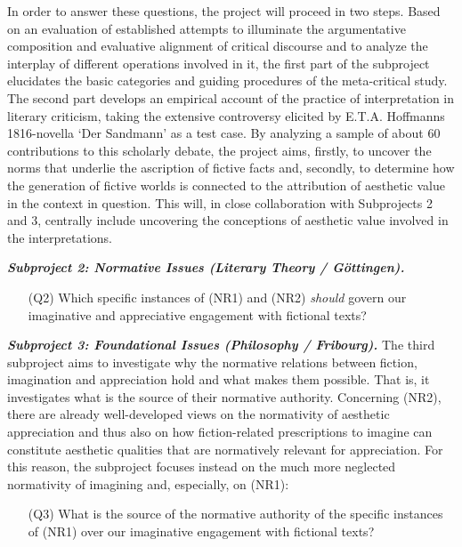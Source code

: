In order to answer these questions, the project will proceed in two steps. Based on an evaluation of established attempts to illuminate the argumentative composition and evaluative alignment of critical discourse and to analyze the interplay of different operations involved in it, the first part of the subproject elucidates the basic categories and guiding procedures of the meta-critical study. The second part develops an empirical account of the practice of interpretation in literary criticism, taking the extensive controversy elicited by E.T.A. Hoffmanns 1816-novella `Der Sandmann' as a test case. By analyzing a sample of about 60 contributions to this scholarly debate, the project aims, firstly, to uncover the norms that underlie the ascription of fictive facts and, secondly, to determine how the generation of fictive worlds is connected to the attribution of aesthetic value in the context in question. This will, in close collaboration with Subprojects 2 and 3, centrally include uncovering the conceptions of aesthetic value involved in the interpretations.



\vspace{.2cm}
\noindent\textbf{\emph{Subproject 2: Normative Issues (Literary Theory / G\"ottingen).}}

\vspace{-.1cm}
\begin{itemize}[leftmargin=2cm]
\item[(Q2)] Which specific instances of (NR1) and (NR2) \emph{should} govern our imaginative and appreciative engagement with fictional texts?
\end{itemize}
\vspace{-.1cm}


\vspace{.2cm}
\noindent\textbf{\emph{Subproject 3: Foundational Issues (Philosophy / Fribourg).}} The third subproject aims to investigate why the normative relations between fiction, imagination and appreciation hold and what makes them possible. That is, it investigates what is the source of their normative authority. Concerning (NR2), there are already well-developed views on the normativity of aesthetic appreciation and thus also on how fiction-related prescriptions to imagine can constitute aesthetic qualities that are normatively relevant for appreciation. For this reason, the subproject focuses instead on the much more neglected normativity of imagining and, especially, on (NR1): 

\vspace{-.1cm}
\begin{itemize}[leftmargin=2cm]
\item[(Q3)] What is the source of the normative authority of the specific instances of (NR1) over our imaginative engagement with fictional texts?
\end{itemize}
\vspace{-.1cm}

